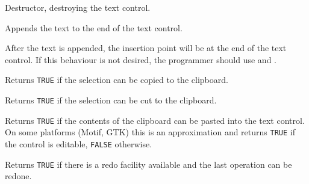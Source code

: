 
Destructor, destroying the text control.

\label{wxtextctrlappendtext}


Appends the text to the end of the text control.




After the text is appended, the insertion point will be at the end of the text control. If this behaviour is not desired,
the programmer should use  and .



\label{wxtextctrlcancopy}


Returns {\tt TRUE} if the selection can be copied to the clipboard.

\label{wxtextctrlcancut}


Returns {\tt TRUE} if the selection can be cut to the clipboard.

\label{wxtextctrlcanpaste}


Returns {\tt TRUE} if the contents of the clipboard can be pasted into the
text control. On some platforms (Motif, GTK) this is an approximation
and returns {\tt TRUE} if the control is editable, {\tt FALSE} otherwise.

\label{wxtextctrlcanredo}


Returns {\tt TRUE} if there is a redo facility available and the last operation
can be redone.

\label{wxtextctrlcanundo}


